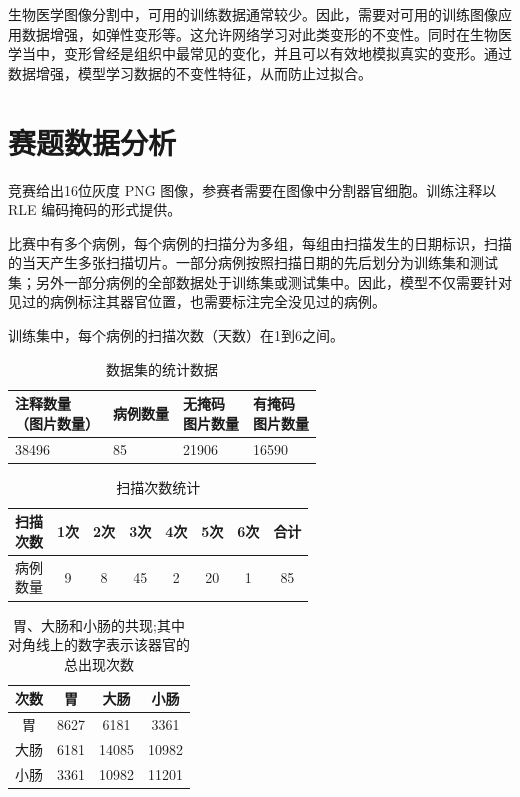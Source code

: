 \documentclass[letterpaper, 10pt, conference, twoside]{ieeeconf}
\begin{document}
生物医学图像分割中，可用的训练数据通常较少。因此，需要对可用的训练图像应用数据增强，如弹性变形等。这允许网络学习对此类变形的不变性。同时在生物医学当中，变形曾经是组织中最常见的变化，并且可以有效地模拟真实的变形。通过数据增强，模型学习数据的不变性特征，从而防止过拟合。


\section{赛题数据分析}

竞赛给出16位灰度 PNG 图像，参赛者需要在图像中分割器官细胞。训练注释以 RLE 编码掩码的形式提供。

比赛中有多个病例，每个病例的扫描分为多组，每组由扫描发生的日期标识，扫描的当天产生多张扫描切片。一部分病例按照扫描日期的先后划分为训练集和测试集；另外一部分病例的全部数据处于训练集或测试集中。因此，模型不仅需要针对见过的病例标注其器官位置，也需要标注完全没见过的病例。

训练集中，每个病例的扫描次数（天数）在1到6之间。

\begin{table}[htbp]
  \centering
 \caption{数据集的统计数据}
 \label{tab:table1}
 \begin{tabular}{llll}
  \toprule
  \makecell[l]{注释数量\\（图片数量）} & 病例数量 & \makecell[l]{无掩码\\图片数量}& \makecell[l]{有掩码\\图片数量}\\
  \midrule
    38496&85&21906&16590\\
  \bottomrule
 \end{tabular}
\end{table}

\begin{table}[htbp]
  \centering
 \caption{扫描次数统计}
 \label{tab:table2}
 \begin{tabular}{l|ccccccc}
  \toprule
  \makecell[l]{扫描\\次数}& 1次 & 2次 & 3次 & 4次 & 5次 & 6次 & 合计\\
  \midrule
  \makecell[l]{病例\\数量}& 9 & 8 & 45 & 2 & 20 & 1 & 85\\
  \bottomrule
 \end{tabular}
\end{table}

\begin{table}[htbp]
  \centering
  \caption{胃、大肠和小肠的共现;其中对角线上的数字表示该器官的总出现次数}
  \label{tab:table3}
\begin{tabular}{||c||c|c|c||}
\hline
次数&胃&大肠&小肠 \\
\hline\hline
胃&8627&6181&3361 \\
\hline
大肠&6181&14085&10982 \\
\hline
小肠&3361&10982&11201 \\
\hline
\end{tabular}
\end{table}
\end{document}
